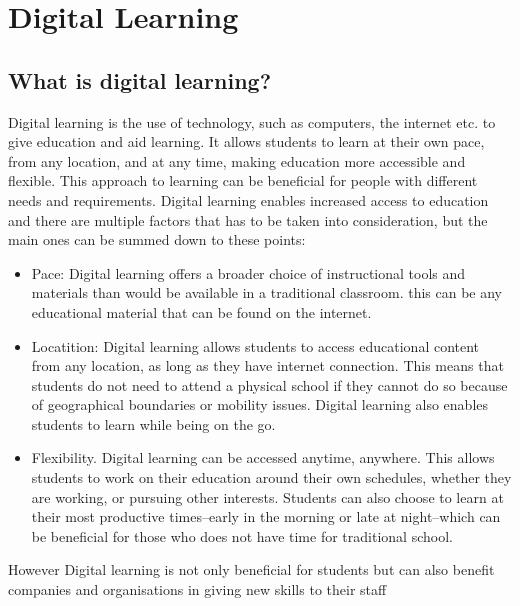 \section{Digital Learning}\label{sec:digital_learning}
\subsection{What is digital learning?}\label{sec:what_is_digital_learning}

Digital learning is the use of technology, such as computers, the internet etc. to give education and aid learning. It allows students to learn at their own pace, from any location, and at any time, making education more accessible and flexible. 
This approach to learning can be beneficial for people with different needs and requirements. Digital learning enables increased access to education and there are multiple factors that has to be taken into consideration, but the main ones can be summed down to these points\cite*{What_Is_Digital_Learning}:
\begin{itemize}
  \item   Pace:
	Digital learning offers a broader choice of instructional tools and materials than would be available in a traditional classroom. this can be any educational material that can be found on the internet.\cite*{What_Is_Digital_Learning}
  \item Locatition:
	  Digital learning allows students to access educational content from any location, as long as they have internet connection. This means that students do not need to attend a physical school if they cannot do so because of geographical boundaries or mobility issues. Digital learning also enables students to learn while being on the go.\cite*{What_Is_Digital_Learning}
  \item Flexibility. 
	Digital learning can be accessed anytime, anywhere. This allows students to work on their education around their own schedules, whether they are working, or pursuing other interests. Students can also choose to learn at their most productive times--early in the morning or late at night--which can be  beneficial for those who does not have time for traditional school.\cite*{What_Is_Digital_Learning}
\end{itemize}
However Digital learning is not only beneficial for students but can also benefit companies and organisations in giving new skills to their staff\cite*{Skills_Digital_Learning}

